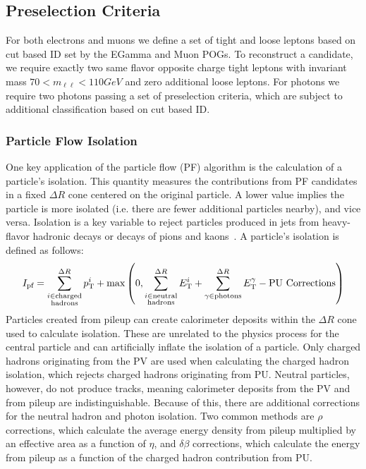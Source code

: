 \subsection{Preselection Criteria} \label{sec:ana_preselection}
For both electrons and muons we define a set of tight and loose leptons based on cut based ID set by the EGamma and Muon POGs. To reconstruct a \VZ candidate, we require exactly two same flavor opposite charge tight leptons with invariant mass $70<m_{\ell\ell}<110\unit{GeV}$ and zero additional loose leptons. For photons we require two photons passing a set of preselection criteria, which are subject to additional classification based on cut based ID.

\subsubsection{Particle Flow Isolation} \label{sec:ana_isolation}
One key application of the particle flow (PF) algorithm is the calculation of a particle's isolation. This quantity measures the \pt contributions from PF candidates in a fixed $\Delta R$ cone centered on the original particle. A lower value implies the particle is more isolated (i.e. there are fewer additional particles nearby), and vice versa. Isolation is a key variable to reject particles produced in jets from heavy-flavor hadronic decays or decays of pions and kaons~\cite{Sirunyan:PF}. A particle's isolation is defined as follows:
\begin{equation}
	\label{eq:pfiso}
	I_\text{pf} = \sum_{\substack{i\in\text{charged}\\\text{hadrons}}}^{\Delta R}p_\mathrm{T}^i+\text{max}\left(0,\sum_{\substack{i\in\text{neutral}\\\text{hadrons}}}^{\Delta R}E_\mathrm{T}^i+\sum_{\gamma\in\text{photons}}^{\Delta R}E_\mathrm{T}^\gamma-\text{PU Corrections}\right)
\end{equation}
Particles created from pileup can create calorimeter deposits within the $\Delta R$ cone used to calculate isolation. These are unrelated to the physics process for the central particle and can artificially inflate the isolation of a particle. Only charged hadrons originating from the PV are used when calculating the charged hadron isolation, which rejects charged hadrons originating from PU. Neutral particles, however, do not produce tracks, meaning calorimeter deposits from the PV and from pileup are indistinguishable. Because of this, there are additional corrections for the neutral hadron and photon isolation. Two common methods are $\rho$ corrections, which calculate the average energy density from pileup multiplied by an effective area as a function of $\eta$, and $\delta\beta$ corrections, which calculate the energy from pileup as a function of the charged hadron contribution from PU.

